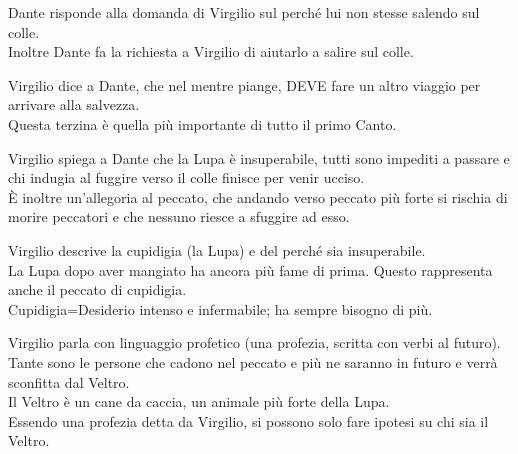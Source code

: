 \documentclass{article}
\begin{document}

Dante risponde alla domanda di Virgilio sul perché lui non stesse salendo sul colle.\\
Inoltre Dante fa la richiesta a Virgilio di aiutarlo a salire sul colle.


Virgilio dice a Dante, che nel mentre piange, DEVE fare un altro viaggio per arrivare alla salvezza.\\
Questa terzina è quella più importante di tutto il primo Canto.


Virgilio spiega a Dante che la Lupa è insuperabile, tutti sono impediti a passare e chi indugia al fuggire verso il colle finisce per venir ucciso.\\
È inoltre un'allegoria al peccato, che andando verso peccato più forte si rischia di morire peccatori e che nessuno riesce a sfuggire ad esso.


Virgilio descrive la cupidigia (la Lupa) e del perché sia insuperabile.\\
La Lupa dopo aver mangiato ha ancora più fame di prima. Questo rappresenta anche il peccato di cupidigia.\\
Cupidigia=Desiderio intenso e infermabile; ha sempre bisogno di più.


Virgilio parla con linguaggio profetico (una profezia, scritta con verbi al futuro).\\
Tante sono le persone che cadono nel peccato e più ne saranno in futuro e verrà sconfitta dal Veltro.\\
Il Veltro è un cane da caccia, un animale più forte della Lupa.\\
Essendo una profezia detta da Virgilio, si possono solo fare ipotesi su chi sia il Veltro.
\end{document}
